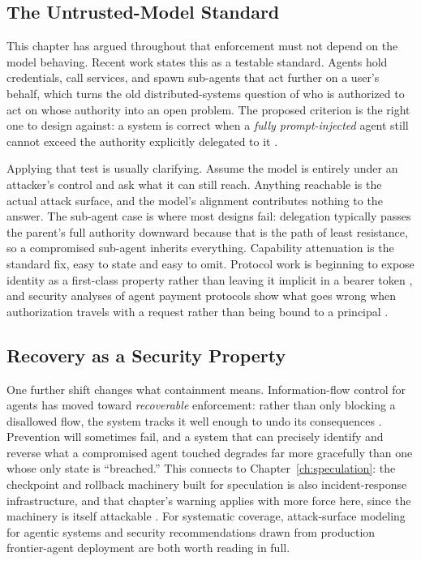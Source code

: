 \documentclass[11pt]{book}
\begin{document}
\subsection{The Untrusted-Model Standard}

This chapter has argued throughout that enforcement must not depend on the model behaving. Recent work states this as a testable standard. Agents hold credentials, call services, and spawn sub-agents that act further on a user's behalf, which turns the old distributed-systems question of who is authorized to act on whose authority into an open problem. The proposed criterion is the right one to design against: a system is correct when a \textit{fully prompt-injected} agent still cannot exceed the authority explicitly delegated to it \cite{delegation2026}.

Applying that test is usually clarifying. Assume the model is entirely under an attacker's control and ask what it can still reach. Anything reachable is the actual attack surface, and the model's alignment contributes nothing to the answer. The sub-agent case is where most designs fail: delegation typically passes the parent's full authority downward because that is the path of least resistance, so a compromised sub-agent inherits everything. Capability attenuation is the standard fix, easy to state and easy to omit. Protocol work is beginning to expose identity as a first-class property rather than leaving it implicit in a bearer token \cite{identityproto2026}, and security analyses of agent payment protocols show what goes wrong when authorization travels with a request rather than being bound to a principal \cite{ap2sec2026}.

\subsection{Recovery as a Security Property}

One further shift changes what containment means. Information-flow control for agents has moved toward \textit{recoverable} enforcement: rather than only blocking a disallowed flow, the system tracks it well enough to undo its consequences \cite{appa2026}. Prevention will sometimes fail, and a system that can precisely identify and reverse what a compromised agent touched degrades far more gracefully than one whose only state is ``breached.'' This connects to Chapter~\ref{ch:speculation}: the checkpoint and rollback machinery built for speculation is also incident-response infrastructure, and that chapter's warning applies with more force here, since the machinery is itself attackable \cite{saferesume2026}. For systematic coverage, attack-surface modeling for agentic systems \cite{matra2026} and security recommendations drawn from production frontier-agent deployment \cite{secconsider2026} are both worth reading in full.
\end{document}
